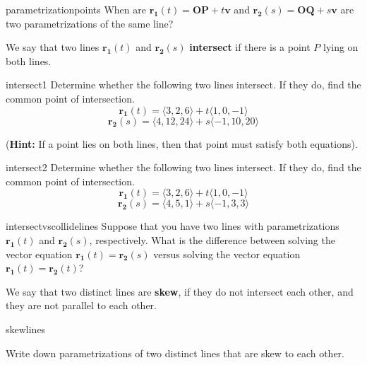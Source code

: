 \begin{problem}{parametrizationpoints}
    When are $\bm{r_1}(t) = \bm{OP} + t\bm{v}$ and $\bm{r_2}(s) = \bm{OQ} + s\bm{v}$ are two parametrizations of the same line?
\end{problem}

\begin{definition}
We say that two lines $\bm{r_1}(t)$ and $\bm{r_2}(s)$ \textbf{intersect} if there is a point $P$ lying on both lines. 
\end{definition}



\begin{problem}{intersect1}
    Determine whether the following two lines intersect.  If they do, find the common point of intersection.
    $$\bm{r_1}(t) =   \langle3,2,6\rangle + t\langle1,0,-1\rangle$$
    $$\bm{r_2}(s) =   \langle4,12,24\rangle + s\langle-1,10,20\rangle$$
    
    (\textbf{Hint:}  If a point lies on both lines, then that point must satisfy both equations).
\end{problem}

\begin{problem}{intersect2}
    Determine whether the following two lines intersect.  If they do, find the common point of intersection.
    $$\bm{r_1}(t) =   \langle3,2,6\rangle + t\langle1,0,-1\rangle$$
    $$\bm{r_2}(s) =   \langle4,5,1\rangle + s\langle-1,3,3\rangle$$
\end{problem}

\begin{problem}{intersectvscollidelines}
    Suppose that you have two lines with parametrizations $\bm{r_1}(t)$ and $\bm{r_2}(s)$, respectively.  What is the difference between solving the vector equation $\bm{r_1}(t) = \bm{r_2}(s)$ versus solving the vector equation $\bm{r_1}(t) = \bm{r_2}(t)$?
\end{problem}

\begin{definition}
    We say that two distinct lines are \textbf{skew}, if they do not intersect each other, and they are not parallel to each other.
    \end{definition}

\begin{problem}{skewlines}
    
    Write down parametrizations of two distinct lines that are skew to each other.  
    
\end{problem}


